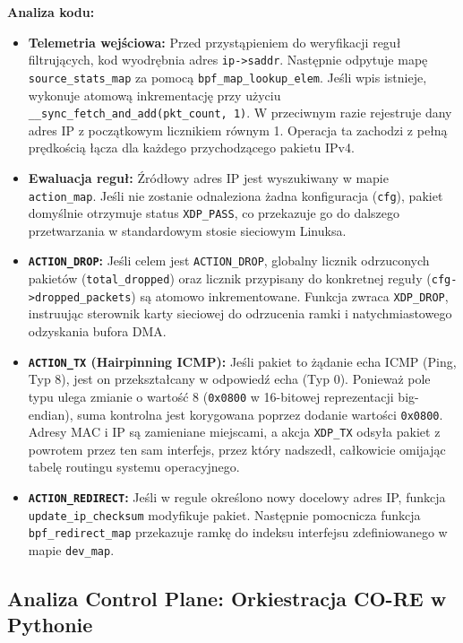 \documentclass[11pt,a4paper]{article}
\begin{document}
\noindent \textbf{Analiza kodu:} 
\begin{itemize}
    \item \textbf{Telemetria wejściowa:} Przed przystąpieniem do weryfikacji reguł filtrujących, kod wyodrębnia adres \texttt{ip->saddr}. Następnie odpytuje mapę \texttt{source\_stats\_map} za pomocą \texttt{bpf\_map\_lookup\_elem}. Jeśli wpis istnieje, wykonuje atomową inkrementację przy użyciu \texttt{\_\_sync\_fetch\_and\_add(pkt\_count, 1)}. W przeciwnym razie rejestruje dany adres IP z początkowym licznikiem równym 1. Operacja ta zachodzi z pełną prędkością łącza dla każdego przychodzącego pakietu IPv4.
    \item \textbf{Ewaluacja reguł:} Źródłowy adres IP jest wyszukiwany w mapie \texttt{action\_map}. Jeśli nie zostanie odnaleziona żadna konfiguracja (\texttt{cfg}), pakiet domyślnie otrzymuje status \texttt{XDP\_PASS}, co przekazuje go do dalszego przetwarzania w standardowym stosie sieciowym Linuksa.
    \item \textbf{\texttt{ACTION\_DROP}:} Jeśli celem jest \texttt{ACTION\_DROP}, globalny licznik odrzuconych pakietów (\texttt{total\_dropped}) oraz licznik przypisany do konkretnej reguły (\texttt{cfg->dropped\_packets}) są atomowo inkrementowane. Funkcja zwraca \texttt{XDP\_DROP}, instruując sterownik karty sieciowej do odrzucenia ramki i natychmiastowego odzyskania bufora DMA.
    \item \textbf{\texttt{ACTION\_TX} (Hairpinning ICMP):} Jeśli pakiet to żądanie echa ICMP (Ping, Typ 8), jest on przekształcany w odpowiedź echa (Typ 0). Ponieważ pole typu ulega zmianie o wartość 8 (\texttt{0x0800} w 16-bitowej reprezentacji big-endian), suma kontrolna jest korygowana poprzez dodanie wartości \texttt{0x0800}. Adresy MAC i IP są zamieniane miejscami, a akcja \texttt{XDP\_TX} odsyła pakiet z powrotem przez ten sam interfejs, przez który nadszedł, całkowicie omijając tabelę routingu systemu operacyjnego.
    \item \textbf{\texttt{ACTION\_REDIRECT}:} Jeśli w regule określono nowy docelowy adres IP, funkcja \texttt{update\_ip\_checksum} modyfikuje pakiet. Następnie pomocnicza funkcja \texttt{bpf\_redirect\_map} przekazuje ramkę do indeksu interfejsu zdefiniowanego w mapie \texttt{dev\_map}.
\end{itemize}

\subsection{Analiza Control Plane: Orkiestracja CO-RE w Pythonie}
\end{document}

